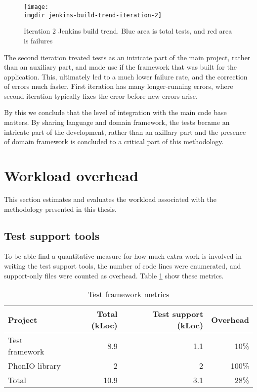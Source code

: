 \begin{figure}[!hbpt]
\centering
\texttt{[image: \\imgdir jenkins-build-trend-iteration-2]}
\caption{Iteration 2 Jenkins build trend. Blue area is total tests, and red area is failures}
\label{fig:jenkins-build-trend-iteration-2}
\end{figure}

\noindent The second iteration treated tests as an intricate part of the main project, rather than an auxiliary part, and made use if the framework that was built for the application. This, ultimately led to a much lower failure rate, and the correction of errors much faster. First iteration has many longer-running errors, where second iteration typically fixes the error before new errors arise.\medskip

\noindent By this we conclude that the level of integration with the main code base matters. By sharing language and domain framework, the tests became an intricate part of the development, rather than an axillary part and the presence of domain framework is concluded to a critical part of this methodology.

\section{Workload overhead}
This section estimates and evaluates the workload associated with the methodology presented in this thesis.
\subsection{Test support tools}
To be able find a quantitative measure for how much extra work is involved in writing the test support tools, the number of code lines were enumerated, and support-only files were counted as overhead. Table \ref{tab:loc-metrics} show these metrics.\medskip

\begin{table}[!htbp]
\centering
\begin{tabular}{ | l | r | r | r |}
   \hline
   Project        & Total (kLoc) & Test support (kLoc) & Overhead \\ \hline
   Test framework & 8.9          & 1.1                 & 10\%     \\
   PhonIO library & 2            & 2                   & 100\%    \\
   \hline
   \hline
   Total          & 10.9         & 3.1                 & 28\%     \\
   \hline
\end{tabular}
\caption{Test framework metrics}
\label{tab:loc-metrics}
\end{table}

